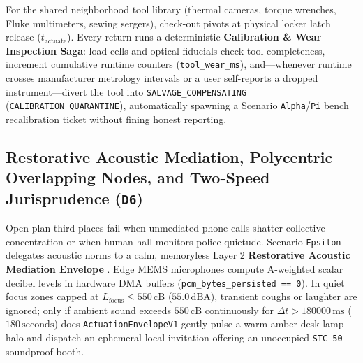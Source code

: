 For the shared neighborhood tool library (thermal cameras, torque wrenches, Fluke multimeters, sewing
sergers), check-out pivots at physical locker latch release ($t_{\mathrm{actuate}}$). Every return runs a
deterministic \textbf{Calibration \& Wear Inspection Saga}: load cells and optical fiducials check tool
completeness, increment cumulative runtime counters (\texttt{tool\_wear\_ms}), and---whenever runtime
crosses manufacturer metrology intervals or a user self-reports a dropped instrument---divert the tool
into \texttt{SALVAGE\_COMPENSATING} (\texttt{CALIBRATION\_QUARANTINE}), automatically spawning a Scenario
\texttt{Alpha}/\texttt{Pi} bench recalibration ticket without fining honest reporting.

\subsection{Restorative Acoustic Mediation, Polycentric Overlapping Nodes, and Two-Speed Jurisprudence (\texttt{D6})}

Open-plan third places fail when unmediated phone calls shatter collective concentration or when human
hall-monitors police quietude. Scenario \texttt{Epsilon} delegates acoustic norms to a calm, memoryless
Layer 2 \textbf{Restorative Acoustic Mediation Envelope} \parencite{weiser1996calm}. Edge MEMS microphones
compute A-weighted scalar decibel levels in hardware DMA buffers (\texttt{pcm\_bytes\_persisted == 0}). In
quiet focus zones capped at $L_{\mathrm{focus}} \le 550\,\mathrm{cB}$ ($55.0\,\mathrm{dBA}$), transient
coughs or laughter are ignored; only if ambient sound exceeds $550\,\mathrm{cB}$ continuously for
$\Delta t > 180000\,\mathrm{ms}$ ($180\,\mathrm{seconds}$) does \texttt{ActuationEnvelopeV1} gently pulse
a warm amber desk-lamp halo and dispatch an ephemeral local invitation offering an unoccupied
\texttt{STC-50} soundproof booth.

